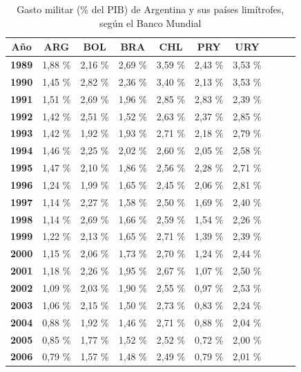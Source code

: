 \documentclass[12pt,a4paper,twoside]{book}
\begin{document}
\begin{center}
\begin{longtable}{|c|c|c|c|c|c|c|c|c|c|}
\caption{Gasto militar (\% del PIB) de Argentina y sus países limítrofes, según el Banco Mundial}
\label{tab:tablePBI} \\
\hline
\textbf{Año} & \textbf{ARG} & \textbf{BOL} & \textbf{BRA} & \textbf{CHL} & \textbf{PRY} & \textbf{URY} \\
\hline
\textbf{1989} & 1,88 \% & 2,16 \% & 2,69 \% & 3,59 \% & 2,43 \% & 3,53 \% \\
\hline
\textbf{1990} & 1,45 \% & 2,82 \% & 2,36 \% & 3,40 \% & 2,13 \% & 3,53 \% \\
\hline
\textbf{1991} & 1,51 \% & 2,69 \% & 1,96 \% & 2,85 \% & 2,83 \% & 2,39 \% \\
\hline
\textbf{1992} & 1,42 \% & 2,51 \% & 1,52 \% & 2,63 \% & 2,37 \% & 2,85 \% \\
\hline
\textbf{1993} & 1,42 \% & 1,92 \% & 1,93 \% & 2,71 \% & 2,18 \% & 2,79 \% \\
\hline
\textbf{1994} & 1,46 \% & 2,25 \% & 2,02 \% & 2,60 \% & 2,05 \% & 2,58 \% \\
\hline
\textbf{1995} & 1,47 \% & 2,10 \% & 1,86 \% & 2,56 \% & 2,28 \% & 2,71 \% \\
\hline
\textbf{1996} & 1,24 \% & 1,99 \% & 1,65 \% & 2,45 \% & 2,06 \% & 2,81 \% \\
\hline
\textbf{1997} & 1,14 \% & 2,27 \% & 1,58 \% & 2,50 \% & 1,69 \% & 2,40 \% \\
\hline
\textbf{1998} & 1,14 \% & 2,69 \% & 1,66 \% & 2,59 \% & 1,54 \% & 2,26 \% \\
\hline
\textbf{1999} & 1,22 \% & 2,13 \% & 1,65 \% & 2,71 \% & 1,39 \% & 2,39 \% \\
\hline
\textbf{2000} & 1,15 \% & 2,06 \% & 1,73 \% & 2,70 \% & 1,24 \% & 2,44 \% \\
\hline
\textbf{2001} & 1,18 \% & 2,26 \% & 1,95 \% & 2,67 \% & 1,07 \% & 2,50 \% \\
\hline
\textbf{2002} & 1,09 \% & 2,03 \% & 1,90 \% & 2,55 \% & 0,97 \% & 2,53 \% \\
\hline
\textbf{2003} & 1,06 \% & 2,15 \% & 1,50 \% & 2,73 \% & 0,83 \% & 2,24 \% \\
\hline
\textbf{2004} & 0,88 \% & 1,92 \% & 1,46 \% & 2,71 \% & 0,88 \% & 2,04 \% \\
\hline
\textbf{2005} & 0,85 \% & 1,77 \% & 1,52 \% & 2,52 \% & 0,72 \% & 2,00 \% \\
\hline
\textbf{2006} & 0,79 \% & 1,57 \% & 1,48 \% & 2,49 \% & 0,79 \% & 2,01 \% \\

\end{longtable}
\end{center}
\end{document}
